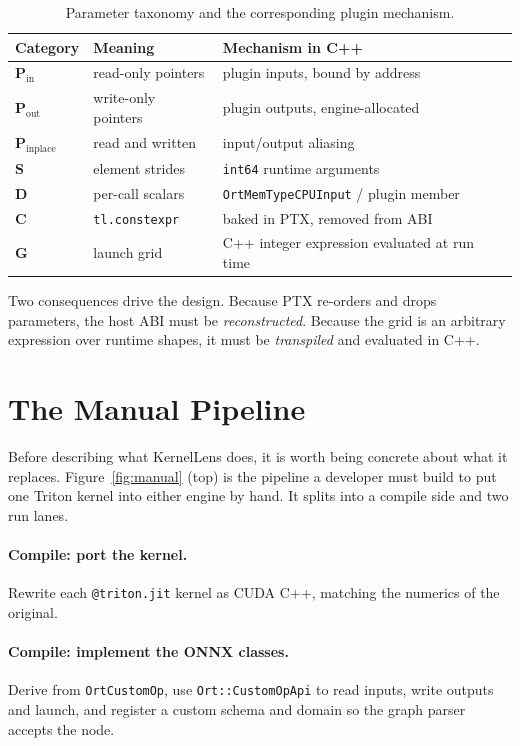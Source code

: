 \documentclass[11pt,a4paper]{article}
\begin{document}
\begin{table}[h!]
\centering
\small
\begin{tabularx}{\textwidth}{l l X}
\toprule
\textbf{Category} & \textbf{Meaning} & \textbf{Mechanism in C++} \\ \midrule
$\mathbf{P}_{\text{in}}$ & read-only pointers & plugin inputs, bound by address \\
$\mathbf{P}_{\text{out}}$ & write-only pointers & plugin outputs, engine-allocated \\
$\mathbf{P}_{\text{inplace}}$ & read and written & input/output aliasing \\
$\mathbf{S}$ & element strides & \texttt{int64} runtime arguments \\
$\mathbf{D}$ & per-call scalars & \texttt{OrtMemTypeCPUInput} / plugin member \\
$\mathbf{C}$ & \texttt{tl.constexpr} & baked in PTX, removed from ABI \\
$\mathbf{G}$ & launch grid & C++ integer expression evaluated at run time \\
\bottomrule
\end{tabularx}
\caption{Parameter taxonomy and the corresponding plugin mechanism.}
\label{tab:taxonomy}
\end{table}

Two consequences drive the design. Because PTX re-orders and drops parameters,
the host ABI must be \emph{reconstructed}. Because the grid is an arbitrary
expression over runtime shapes, it must be \emph{transpiled} and evaluated in
C++.

\section{The Manual Pipeline}
\label{sec:manual}

Before describing what KernelLens does, it is worth being concrete about what it
replaces. Figure~\ref{fig:manual} (top) is the pipeline a developer must build to
put one Triton kernel into either engine by hand. It splits into a compile side
and two run lanes.

\paragraph{Compile: port the kernel.} Rewrite each \texttt{@triton.jit} kernel as
CUDA C++, matching the numerics of the original.

\paragraph{Compile: implement the ONNX classes.} Derive from
\texttt{OrtCustomOp}, use \texttt{Ort::CustomOpApi} to read inputs, write outputs
and launch, and register a custom schema and domain so the graph parser accepts
the node.
\end{document}

